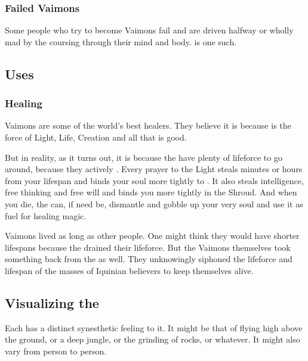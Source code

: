 \subsubsection{Failed Vaimons}
Some people who try to become Vaimons fail and are driven halfway or wholly mad by the \Archons{} coursing through their mind and body. 
 is one such. 









\subsection{Uses}





\subsubsection{Healing}
 Vaimons are some of the world's best healers. They believe it is because  is the force of Light, Life, Creation and all that is good. 

But in reality, as it turns out, it is because the \sephiroth{} have plenty of lifeforce to go around, because they actively . 
Every prayer to the Light steals minutes or hours from your lifespan and binds your soul more tightly to \iquin{}. 
It also steals intelligence, free thinking and free will and binds you more tightly in the Shroud. 
And when you die, the \sephiroth{} can, if need be, dismantle and gobble up your very soul and use it as fuel for healing magic. 

Vaimons lived as long as other people.
One might think they would have shorter lifespans because the \sephiroth drained their lifeforce. 
But the Vaimons themselves took something back from the \sephiroth as well. 
They unknowingly siphoned the lifeforce and lifespan of the masses of Iquinian believers to keep themselves alive. 









\subsection{Visualizing the \Archon}
Each \Archon{} has a distinct synesthetic feeling to it. 
It might be that of flying high above the ground, or a deep jungle, or the grinding of rocks, or whatever. 
It might also vary from person to person. 

